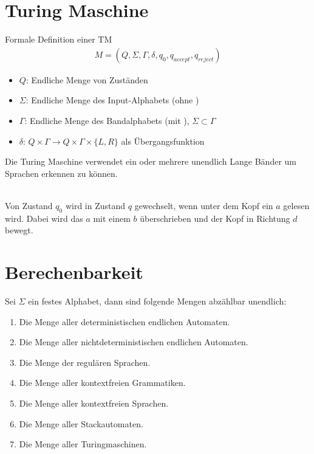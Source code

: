 \section*{Turing Maschine} 
Formale Definition einer TM
\begin{align*}
    M = (Q, \Sigma, \Gamma, \delta, q_0, q_{accept}, q_{reject})
\end{align*}
\begin{itemize}
    \item \(Q\): Endliche Menge von Zuständen
    \item \(\Sigma\): Endliche Menge des Input-Alphabets (ohne \textvisiblespace)
    \item \(\Gamma\): Endliche Menge des Bandalphabets (mit \textvisiblespace), \(\Sigma \subset \Gamma\)
    \item \(\delta\): \(Q \times \Gamma \rightarrow Q \times \Gamma \times \{L, R\}\) als Übergangsfunktion
\end{itemize}
Die Turing Maschine verwendet ein oder mehrere unendlich Lange Bänder um Sprachen erkennen zu können.
\\
Von Zustand \(q_0\) wird in Zustand \(q\) gewechselt, wenn unter dem Kopf ein \(a\) gelesen wird. Dabei wird das \(a\) mit einem \(b\) überschrieben und der Kopf in Richtung \(d\) bewegt. 
\section*{Berechenbarkeit}
Sei \(\Sigma\) ein festes Alphabet, dann sind folgende Mengen abzählbar unendlich:
\begin{enumerate}
    \item Die Menge aller deterministischen endlichen Automaten.
    \item Die Menge aller nichtdeterministischen endlichen Automaten.
    \item Die Menge der regulären Sprachen.
    \item Die Menge aller kontextfreien Grammatiken.
    \item Die Menge aller kontextfreien Sprachen.
    \item Die Menge aller Stackautomaten.
    \item Die Menge aller Turingmaschinen.
\end{enumerate}
